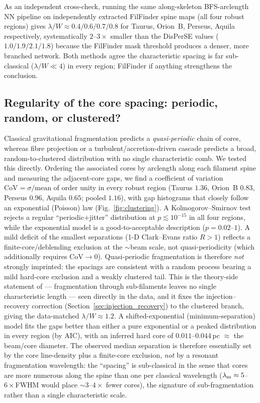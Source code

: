 \documentclass[usenatbib,twoside,twocolumn]{mnras}
\begin{document}
As an independent cross-check, running the same along-skeleton BFS-arclength NN pipeline on independently extracted FilFinder spine maps (all four robust regions) gives $\lambda/W\approx0.4/0.6/0.7/0.8$ for Taurus, Orion~B, Perseus, Aquila respectively, systematically $2$--$3\times$ smaller than the DisPerSE values ($1.0/1.9/2.1/1.8$) because the FilFinder mask threshold produces a denser, more branched network. Both methods agree the characteristic spacing is far sub-classical ($\lambda/W\ll4$) in every region; FilFinder if anything strengthens the conclusion.

\subsection{Regularity of the core spacing: periodic, random, or clustered?}
\label{sec:clustering}
Classical gravitational fragmentation predicts a \emph{quasi-periodic} chain of cores, whereas fibre projection or a turbulent/accretion-driven cascade predicts a broad, random-to-clustered distribution with no single characteristic comb. We tested this directly. Ordering the associated cores by arclength along each filament spine and measuring the adjacent-core gaps, we find a coefficient of variation $\mathrm{CoV}=\sigma/\mathrm{mean}$ of order unity in every robust region (Taurus $1.36$, Orion~B $0.83$, Perseus $0.96$, Aquila $0.65$; pooled $1.16$), with gap histograms that closely follow an exponential (Poisson) law (Fig.~\ref{fig:clustering}). A Kolmogorov--Smirnov test rejects a regular ``periodic$+$jitter'' distribution at $p\lesssim10^{-15}$ in all four regions, while the exponential model is a good-to-acceptable description ($p=0.02$--$1$). A mild deficit of the smallest separations (1-D Clark--Evans ratio $R>1$) reflects a finite-core/deblending exclusion at the $\sim$beam scale, not quasi-periodicity (which additionally requires $\mathrm{CoV}\!\to\!0$). Quasi-periodic fragmentation is therefore \emph{not} strongly imprinted: the spacings are consistent with a random process bearing a mild hard-core exclusion and a weakly clustered tail. This is the theory-side statement of \citet{Clarke2020} --- fragmentation through sub-filaments leaves no single characteristic length --- seen directly in the data, and it fixes the injection--recovery correction (Section~\ref{sec:injection_recovery}) to the clustered branch, giving the data-matched $\lambda/W\approx1.2$. A shifted-exponential (minimum-separation) model fits the gaps better than either a pure exponential or a peaked distribution in every region (by AIC), with an inferred hard core of $0.011$--$0.044$\,pc $\approx$ the beam/core diameter. The observed median separation is therefore essentially set by the core line-density plus a finite-core exclusion, \emph{not} by a resonant fragmentation wavelength: the ``spacing'' is sub-classical in the sense that cores are more numerous along the spine than one per classical wavelength ($\lambda_{\rm m}\approx5$--$6\times$FWHM would place $\sim3$--$4\times$ fewer cores), the signature of sub-fragmentation rather than a single characteristic scale.
\end{document}
